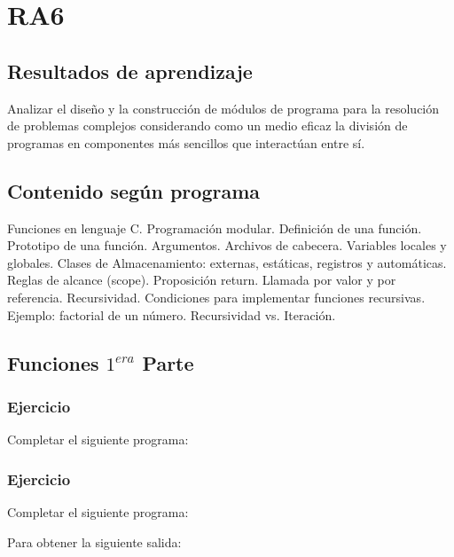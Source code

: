 \section{RA6}
\subsection*{Resultados de aprendizaje}
Analizar el diseño y la construcción de módulos de programa para la resolución de problemas complejos considerando como un medio eficaz la división de programas en componentes más sencillos que interactúan entre sí.

\subsection*{Contenido según programa}
Funciones en lenguaje C.  Programación modular.  Definición de una función.  Prototipo de una función.  Argumentos. Archivos de cabecera. Variables locales y globales. Clases de Almacenamiento: externas, estáticas, registros y automáticas. Reglas de alcance (scope).  Proposición return. Llamada por valor y por referencia.  Recursividad. Condiciones para implementar funciones recursivas. Ejemplo: factorial de un número.  Recursividad vs. Iteración.

\setcounter{subsection}{6}
\subsection*{Funciones $1^{era}$ Parte}

\subsubsection{Ejercicio}
Completar el siguiente programa:

\lstset{inputencoding=utf8/latin1}

{\small
  \lstset{inputencoding=utf8/latin1}
  
}

\subsubsection{Ejercicio}
Completar el siguiente programa:
\lstset{inputencoding=utf8/latin1}

Para obtener la siguiente salida:
{\small
  \lstset{inputencoding=utf8/latin1}
  
}

